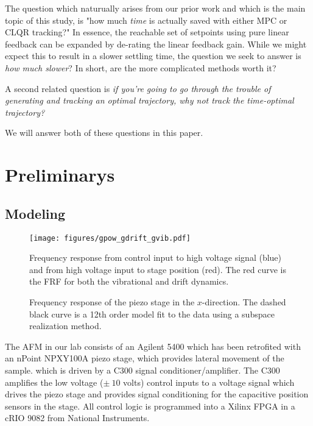 \documentclass[journal,12pt,twocolumn,twoside]{IEEEtran/IEEEtran}
\begin{document}
The question which naturually arises from our prior work and which is the main topic of this study, is "how much \emph{time} is actually saved with either MPC or CLQR tracking?" In essence, the reachable set of setpoints using pure linear feedback can be expanded by de-rating the linear feedback gain. While we might expect this to result in a slower settling time, the question we seek to answer is \emph{how much slower}? In short, are the more complicated methods worth it?

A second related question is \emph{if you're going to go through the trouble of generating and tracking an optimal trajectory, why not track the time-optimal trajectory?}

We will answer both of these questions in this paper. 




\section{Preliminarys}
\label{sec:orgbc45dd3}
\subsection{Modeling}
\begin{figure*}
  \centering
  \begin{minipage}{0.45\textwidth}
  
  \texttt{[image: figures/gpow\_gdrift\_gvib.pdf]}
  \caption{Frequency response from control input to high voltage signal (blue) and from high voltage input to stage position (red). The red curve is the FRF for both the vibrational and drift dynamics.}
  \label{fig:powfrf}
\end{minipage}
\hfill
\begin{minipage}{0.45\textwidth}
  \centering
  
  \caption{Frequency response of the piezo stage in the $x$-direction. The dashed black curve is a 12th order model fit to the data using a subspace realization method.}
  \label{fig:frf_xdir}
\end{minipage}
\end{figure*}
The AFM in our lab consists of an Agilent 5400 which has been retrofited with an nPoint NPXY100A piezo stage, which provides lateral movement of the sample. which is driven by a C300 signal conditioner/amplifier. The C300 amplifies the low voltage ($\pm~10$ volts) control inputs to a voltage signal which drives the piezo stage and provides signal conditioning for the capacitive position sensors in the stage. All control logic is programmed into a Xilinx FPGA in a cRIO 9082 from National Instruments.
\end{document}
